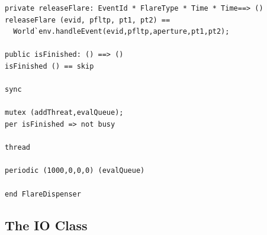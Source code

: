 \documentclass{overturerepchap}
\begin{document}
\begin{lstlisting}
private releaseFlare: EventId * FlareType * Time * Time==> ()
releaseFlare (evid, pfltp, pt1, pt2) == 
  World`env.handleEvent(evid,pfltp,aperture,pt1,pt2);

public isFinished: () ==> ()
isFinished () == skip

sync

mutex (addThreat,evalQueue);
per isFinished => not busy

thread

periodic (1000,0,0,0) (evalQueue)

end FlareDispenser
\end{lstlisting}

\subsection{The IO Class}
\end{document}
